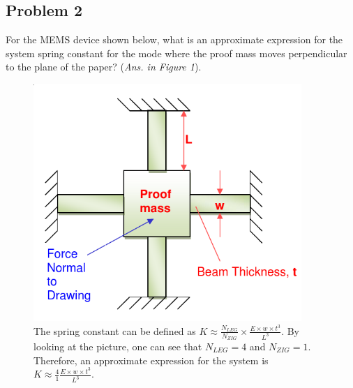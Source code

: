 \documentclass{article}
\begin{document}
\subsection*{Problem 2}
For the MEMS device shown below, what is an approximate expression for the
   system spring constant for the mode where the proof mass moves perpendicular to
   the plane of the paper? (\emph{Ans. in Figure 1}).
   \begin{figure}[b]
	   \centering
	   \includegraphics[width=4in]{hw2_mems}
	   \caption{ The spring constant can be defined as 
		   $ K \approx \frac{N_{LEG}}{N_{ZIG}} \times \frac{E \times w \times t^3}{L^3} $. 
	   By looking at the picture, one can see that $N_{LEG} = 4$ and $N_{ZIG} = 1$. Therefore, an approximate expression for the system is\\ $K \approx \frac{4}{1} \frac{E \times w \times t^3}{L^3}$.}
	   \end{figure}



\label{end}
\end{document}
